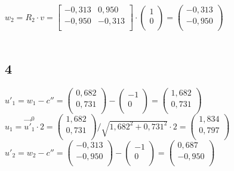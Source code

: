 \documentclass{../Vorlage/mat}
\begin{document}
$w_2 = R_2 \cdot v =
\begin{bmatrix}
-0,313 & 0,950\\
-0,950 & -0,313\\
\end{bmatrix}
\cdot
\begin{pmatrix}
1\\
0\\
\end{pmatrix}
=
\begin{pmatrix}
-0,313\\
-0,950\\
\end{pmatrix}
$\\
\\
\subsection*{4}
$u'_1 = w_1 - c'' =
\begin{pmatrix}
0,682\\
0,731\\
\end{pmatrix}
-
\begin{pmatrix}
-1\\
0\\
\end{pmatrix}
=
\begin{pmatrix}
1,682\\
0,731\\
\end{pmatrix}$\\

$u_1 = \vec{u'}^0_1 \cdot 2 = 
\begin{pmatrix}
1,682\\
0,731\\
\end{pmatrix} / \sqrt{1,682^2+0,731^2} \cdot 2 = 
\begin{pmatrix}
1,834\\
0,797\\
\end{pmatrix}
$\\


$u'_2 = w_2 - c'' =
\begin{pmatrix}
-0,313\\
-0,950\\
\end{pmatrix}
-
\begin{pmatrix}
-1\\
0\\
\end{pmatrix}
=
\begin{pmatrix}
0,687\\
-0,950\\
\end{pmatrix}$\\
\end{document}
